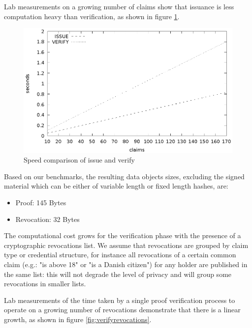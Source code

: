 Lab measurements on a growing number of claims show that issuance is
less computation heavy than verification, as shown in figure
\ref{fig:issueproveverify}.

\begin{figure}
    \centering
    \includegraphics[width=1\linewidth]{issueproveverify.eps}

    \caption{Speed comparison of issue and verify}
    \label{fig:issueproveverify}
\end{figure}

Based on our benchmarks, the resulting data objects sizes, excluding
the signed material which can be either of variable length or fixed
length hashes, are:
\begin{itemize}
    \item Proof:  145 Bytes
    \item Revocation: 32 Bytes
\end{itemize}

The computational cost grows for the verification phase with the
presence of a cryptographic revocations list. We assume that
revocations are grouped by claim type or credential structure, for
instance all revocations of a certain common claim (e.g.: "is above
18" or "is a Danish citizen") for any holder are published in the same
list: this will not degrade the level of privacy and will group some
revocations in smaller lists.

Lab measurements of the time taken by a single proof verification
process to operate on a growing number of revocations demonstrate that
there is a linear growth, as shown in figure
\ref{fig:verifyrevocations}.

